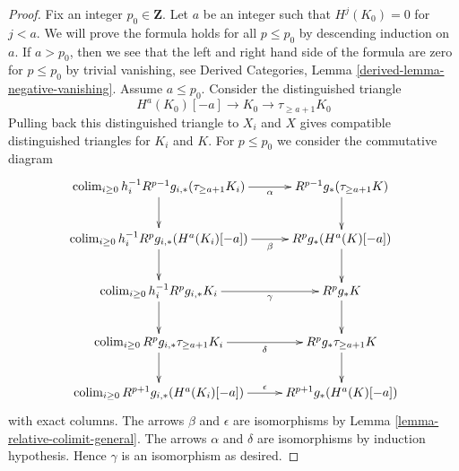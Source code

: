 \documentclass[10pt,a4paper]{amsart}
\theoremstyle{plain}
\theoremstyle{definition}
\theoremstyle{remark}
\numberwithin{equation}{subsection}
\def\colim{\mathop{\mathrm{colim}}\nolimits}
\begin{document}
\begin{proof}
Fix an integer $p_0 \in \mathbf{Z}$.
Let $a$ be an integer such that $H^j(K_0) = 0$ for $j < a$.
We will prove the formula holds for all $p \leq p_0$
by descending induction on $a$. If
$a > p_0$, then we see that the left and right hand side of
the formula are zero for $p \leq p_0$ by trivial vanishing, see
Derived Categories, Lemma \ref{derived-lemma-negative-vanishing}.
Assume $a \leq p_0$. Consider the distinguished triangle
$$
H^a(K_0)[-a] \to K_0 \to \tau_{\geq a + 1}K_0
$$
Pulling back this distinguished triangle to $X_i$ and $X$
gives compatible distinguished triangles for $K_i$ and $K$.
For $p \leq p_0$ we consider the commutative diagram
$$
\xymatrix{
\colim_{i \geq 0} h_i^{-1}R^{p - 1}g_{i, *}(\tau_{\geq a + 1}K_i)
\ar[r]_-\alpha \ar[d] &
R^{p - 1}g_*(\tau_{\geq a + 1}K) \ar[d] \\
\colim_{i \geq 0} h_i^{-1}R^pg_{i, *}(H^a(K_i)[-a])
\ar[r]_-\beta \ar[d] &
R^pg_*(H^a(K)[-a]) \ar[d] \\
\colim_{i \geq 0} h_i^{-1}R^pg_{i, *}K_i
\ar[r]_-\gamma \ar[d] &
R^pg_*K \ar[d] \\
\colim_{i \geq 0} R^pg_{i, *}\tau_{\geq a + 1}K_i
\ar[r]_-\delta \ar[d] &
R^pg_*\tau_{\geq a + 1}K \ar[d] \\
\colim_{i \geq 0} R^{p + 1}g_{i, *}(H^a(K_i)[-a])
\ar[r]^-\epsilon &
R^{p + 1}g_*(H^a(K)[-a])
}
$$
with exact columns. The arrows $\beta$ and $\epsilon$ are isomorphisms by
Lemma \ref{lemma-relative-colimit-general}.
The arrows $\alpha$ and $\delta$ are isomorphisms
by induction hypothesis.
Hence $\gamma$ is an isomorphism as desired.
\end{proof}
\end{document}
